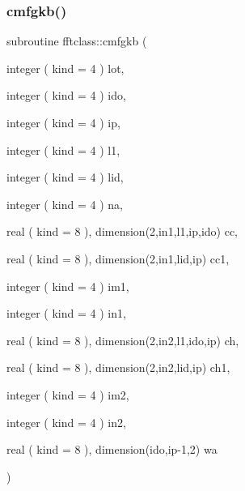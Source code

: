 \mbox{\label{namespacefftclass_ab1c60a144232626a03fad4dd30f88d7d}} 
\subsubsection{\texorpdfstring{cmfgkb()}{cmfgkb()}}
{\footnotesize\ttfamily subroutine fftclass\+::cmfgkb (\begin{DoxyParamCaption}\item[{integer ( kind = 4 )}]{lot,  }\item[{integer ( kind = 4 )}]{ido,  }\item[{integer ( kind = 4 )}]{ip,  }\item[{integer ( kind = 4 )}]{l1,  }\item[{integer ( kind = 4 )}]{lid,  }\item[{integer ( kind = 4 )}]{na,  }\item[{real ( kind = 8 ), dimension(2,in1,l1,ip,ido)}]{cc,  }\item[{real ( kind = 8 ), dimension(2,in1,lid,ip)}]{cc1,  }\item[{integer ( kind = 4 )}]{im1,  }\item[{integer ( kind = 4 )}]{in1,  }\item[{real ( kind = 8 ), dimension(2,in2,l1,ido,ip)}]{ch,  }\item[{real ( kind = 8 ), dimension(2,in2,lid,ip)}]{ch1,  }\item[{integer ( kind = 4 )}]{im2,  }\item[{integer ( kind = 4 )}]{in2,  }\item[{real ( kind = 8 ), dimension(ido,ip-\/1,2)}]{wa }\end{DoxyParamCaption})}

\mbox{\label{namespacefftclass_a317b5c8887b5c2ecb7e518f0c7058589}} 
